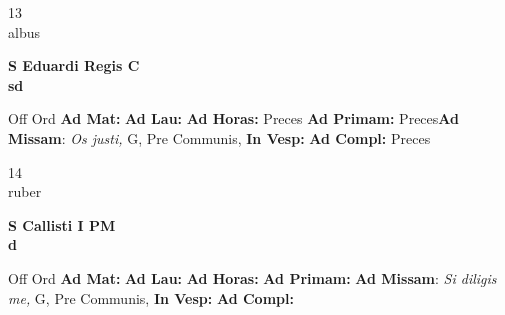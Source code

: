 \documentclass[10pt, openany]{book}
\begin{document}
    \begin{center}
        \begin{minipage}{3.5in}
            \vspace{2em}
            \begin{minipage}{0.5in}
                {\Huge 13} \\
                {\normalsize albus}
            \end{minipage}
            \begin{minipage}{3.0in}
                \textbf{ \large S Eduardi Regis C \\
                \textnormal{\normalsize sd}}

            \end{minipage}
            \begin{justify}Off Ord
                \textbf{Ad Mat: }
                \textbf{Ad Lau: }
                \textbf{Ad Horas: }Preces
                \textbf{Ad Primam: }Preces\textbf{Ad Missam}: \textit{Os justi,} G, Pre Communis, 
                \textbf{In Vesp: }
                \textbf{Ad Compl: }Preces
            \end{justify}
        \end{minipage}
    \end{center}

    \begin{center}
        \begin{minipage}{3.5in}
            \vspace{2em}
            \begin{minipage}{0.5in}
                {\Huge 14} \\
                {\normalsize ruber}
            \end{minipage}
            \begin{minipage}{3.0in}
                \textbf{ \large S Callisti I PM \\
                \textnormal{\normalsize d}}

            \end{minipage}
            \begin{justify}Off Ord
                \textbf{Ad Mat: }
                \textbf{Ad Lau: }
                \textbf{Ad Horas: }
                \textbf{Ad Primam: }\textbf{Ad Missam}: \textit{Si diligis me,} G, Pre Communis, 
                \textbf{In Vesp: }
                \textbf{Ad Compl: }
            \end{justify}
        \end{minipage}
    \end{center}
\end{document}

